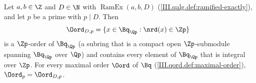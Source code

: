 Let $a,b\in\Z$ and $D\in\N$ with $\operatorname{RamEx}(a,b,D)$ (\cref{III.qalg.def:ramified-exactly}), and let $p$ be a prime with $p\mid D$.
Then
\[
  \Oord_{D,p}=\{x\in\Bq_{\Qp}:\nrd(x)\in\Zp\}
\]
is a $\Zp$-order of $\Bq_{\Qp}$ (a subring that is a compact open $\Zp$-submodule spanning $\Bq_{\Qp}$ over $\Qp$) and contains every element of
$\Bq_{\Qp}$ that is integral over $\Zp$. For every maximal order $\Oord$ of $\Bq$ (\cref{III.qord.def:maximal-order}), $\Oord_p=\Oord_{D,p}$.

